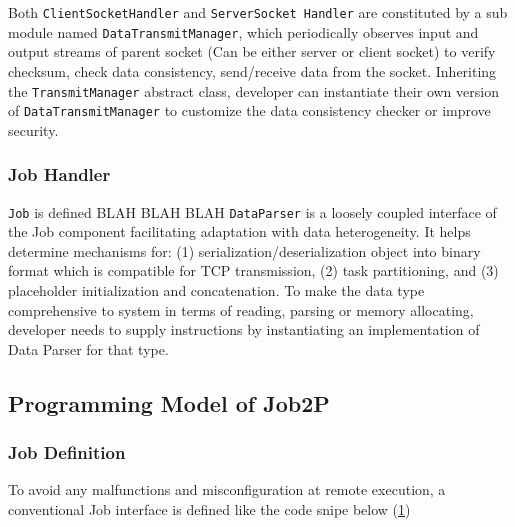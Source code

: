 \documentclass[conference]{IEEEtran}
\begin{document}
Both \texttt{ClientSocketHandler} and \texttt{ServerSocket Handler} are constituted by a sub module named \texttt{DataTransmitManager}, which periodically observes input and output streams of parent socket (Can be either server or client socket) to verify checksum, check data consistency, send/receive data from the socket. Inheriting the \texttt{TransmitManager} abstract class, developer can instantiate their own version of \texttt{DataTransmitManager} to customize the data consistency checker or improve security. 

\subsubsection{Job Handler}
\texttt{Job} is defined BLAH BLAH BLAH
\texttt{DataParser} is a loosely coupled interface of the Job component facilitating adaptation with data heterogeneity. It helps determine mechanisms for: (1) serialization/deserialization object into binary format which is compatible for TCP transmission, (2) task partitioning, and (3) placeholder initialization and concatenation. To make the data type comprehensive to system in terms of reading, parsing or memory allocating, developer needs to supply instructions by instantiating an implementation of Data Parser for that type. 

\subsection{Programming Model of Job2P} 

\subsubsection{Job Definition}\label{job-description}

To avoid any malfunctions and misconfiguration at remote execution, a conventional Job interface is defined like the code snipe below (\ref{code:job_def}) \\

\begin{figure}
\noindent {}	
	\label{code:job_def}
\end{figure}
\end{document}
